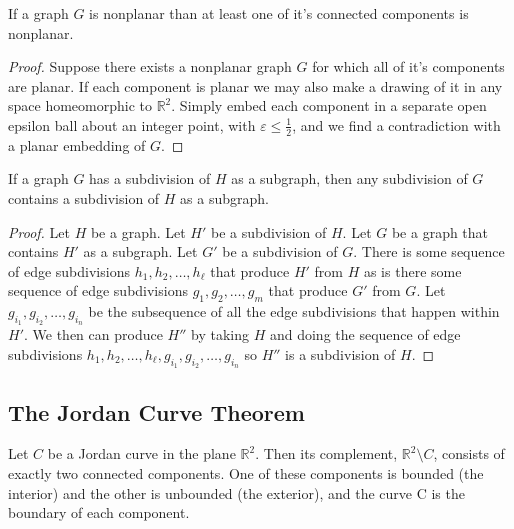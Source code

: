 \documentclass{article}
\begin{document}
\begin{lemma} \label{component}
	If a graph $G$ is nonplanar than at least one of it's connected components is nonplanar.
\end{lemma}

\begin{proof}
	Suppose there exists a nonplanar graph $G$ for which all of it's components are planar. If each component is planar we may also make a drawing of it in any space homeomorphic to $\mathbb R^2$. Simply embed each component in a separate open epsilon ball about an integer point, with $\varepsilon \le \frac12$, and we find a contradiction with a planar embedding of $G$.
\end{proof}


\begin{lemma} \label{subdivisionCarryOn}
	If a graph $G$ has a subdivision of $H$ as a subgraph, then any subdivision of $G$ contains a subdivision of $H$ as a subgraph.
\end{lemma}
\begin{proof}
	Let $H$ be a graph. Let $H'$ be a subdivision of $H$. Let $G$ be a graph that contains $H'$ as a subgraph. Let $G'$ be a subdivision of $G$. There is some sequence of edge subdivisions $h_1,h_2,\ldots,h_\ell$ that produce $H'$ from $H$ as is there some sequence of edge subdivisions $g_1,g_2,\ldots,g_m$ that produce $G'$ from $G$. Let $g_{i_1},g_{i_2},\ldots,g_{i_n}$ be the subsequence of all the edge subdivisions that happen within $H'$. We then can produce $H''$ by taking $H$ and doing the sequence of edge subdivisions $h_1,h_2,\ldots,h_\ell,g_{i_1},g_{i_2},\ldots,g_{i_n}$ so $H''$ is a subdivision of $H$.
\end{proof}





\subsection{The Jordan Curve Theorem}
\begin{theorem}[Jordan curve theorem] %
	Let $C$ be a Jordan curve in the plane $\mathbb R^2$. Then its complement, $\mathbb R^2 \setminus C$, consists of exactly two connected components. One of these components is bounded (the interior) and the other is unbounded (the exterior), and the curve C is the boundary of each component.
\end{theorem}
\end{document}
